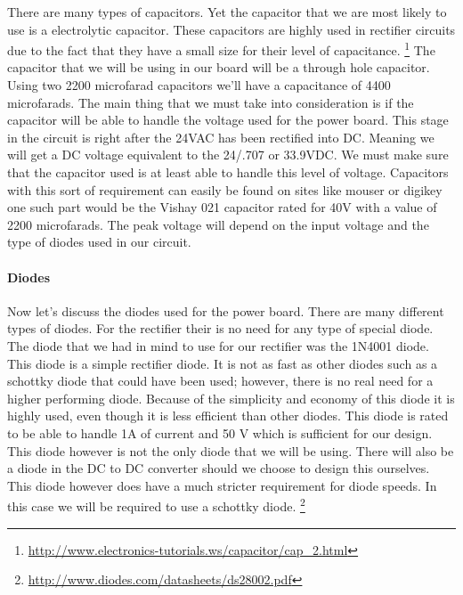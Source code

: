 There are many types of capacitors. Yet the capacitor that we are most likely
to use is a electrolytic capacitor. These capacitors are highly used in
rectifier circuits due to the fact that they have a small size for their level
of capacitance.
\footnote{\url{http://www.electronics-tutorials.ws/capacitor/cap_2.html}} The capacitor
that we will be using in our board will be a through hole capacitor. Using two
2200 microfarad capacitors we{}'ll have a capacitance of 4400 microfarads. The
main thing that we must take into consideration is if the capacitor will be
able to handle the voltage used for the power board. This stage in the circuit
is right after the 24VAC has been rectified into DC. Meaning we will get a DC
voltage equivalent to the 24/.707 or 33.9VDC. We must make sure that the
capacitor used is at least able to handle this level of voltage.
Capacitors with this sort of requirement can easily be found on sites like
mouser or digikey one such part would be the Vishay 021 capacitor rated for 40V
with a value of 2200 microfarads. The peak voltage will depend on the input
voltage and the type of diodes used in our circuit.

\paragraph{Diodes}

Now let{}'s discuss the diodes used for the power board. There are many
different types of diodes. For the rectifier their is no need for any type of
special diode. The diode that we had in mind to use for our rectifier was the
1N4001 diode. This diode is a simple rectifier diode. It is not as fast as
other diodes such as a schottky diode that could have been used; however, there
is no real need for a higher performing diode. Because of the simplicity and
economy of this diode it is highly used, even though it is less efficient than
other diodes. This diode is rated to be able to handle 1A of current and 50 V
which is sufficient for our design. This diode however is not the only diode
that we will be using. There will also be a diode in the DC to DC converter
should we choose to design this ourselves. This diode however does have a much
stricter requirement for diode speeds. In this case we will be required to use
a schottky diode.
\footnote{\url{http://www.diodes.com/datasheets/ds28002.pdf}}

